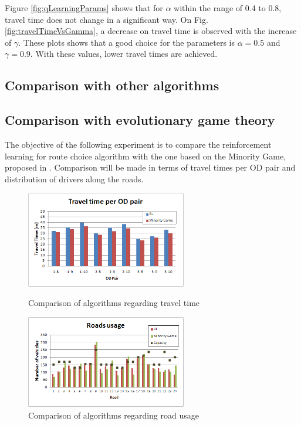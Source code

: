 \documentclass[12pt]{llncs}
\begin{document}
Figure \ref{fig:qLearningParams} shows that for $\alpha$ within the range of 0.4 to 0.8, travel time does not change in a significant way. On Fig. \ref{fig:travelTimeVsGamma}, a decrease on travel time is observed with the increase of $\gamma$. These plots shows that a good choice for the parameters is $\alpha = 0.5$ and $\gamma = 0.9$. With these values, lower travel times are achieved.

\subsection{Comparison with other algorithms}



\subsection{Comparison with evolutionary game theory}

The objective of the following experiment is to compare the reinforcement learning for route choice algorithm with the one based on the Minority Game, proposed in \cite{Galib&Moser2011}. Comparison will be made in terms of travel times per OD pair and distribution of drivers along the roads. 

\begin{figure}[ht]
    \centerline{\includegraphics[width=7cm]{img/rl_vs_mg_traveltime.png}}
    \caption{Comparison of algorithms regarding travel time}
    \label{fig:travelTimeComparison}
\vspace*{3ex} \centering
    \centerline{\includegraphics[width=7cm]{img/roadsUsage_comparison.png}}
    \caption{Comparison of algorithms regarding road usage}
    \label{fig:roadsUsageComparison}
\end{figure}
\end{document}
